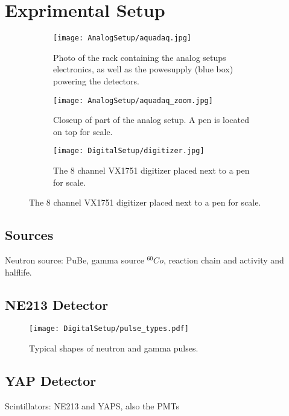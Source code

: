 \documentclass[main.tex]{subfiles}
\begin{document}
\section{Exprimental Setup}\label{sec:exp_setup}
\begin{figure}[ht]
	\begin{subfigure}[b]{0.38\textwidth}
	    \centering
			\captionsetup{width=.80\linewidth}	
    	    \texttt{[image: AnalogSetup/aquadaq.jpg]}
        	\caption{Photo of the rack containing the analog setups electronics, as well as the powesupply (blue box) powering the detectors.}
	    \label{fig:aquadaq_image} 
	\end{subfigure}
	\begin{subfigure}[b]{0.30\textwidth}
	    \centering
	    	\captionsetup{width=1\linewidth}	
    	    \texttt{[image: AnalogSetup/aquadaq\_zoom.jpg]}
        	\caption{Closeup of part of the analog setup. A pen is located on top for scale.}
	    \label{fig:aquadaq_zoom_image} 
	\end{subfigure}
	\begin{subfigure}[b]{0.3\textwidth}
    	\centering
			\captionsetup{width=.6\linewidth}	
        	\texttt{[image: DigitalSetup/digitizer.jpg]}
        	\caption{The 8 channel VX1751 digitizer placed next to a pen for scale.}
    	\label{fig:digitizer_image} 
    \end{subfigure}
\end{figure}

\subsection{Sources}
Neutron source: PuBe, gamma source $^{60}Co$, reaction chain and activity and halflife.



\subsection{NE213 Detector}
\begin{figure}[ht]
	\centering
    	\texttt{[image: DigitalSetup/pulse\_types.pdf]}
        \caption{Typical shapes of neutron and gamma pulses.}
	    \label{fig:pulse_types} 
\end{figure}
\subsection{YAP Detector}
Scintillators: NE213 and YAPS, also the PMTs
\end{document}
